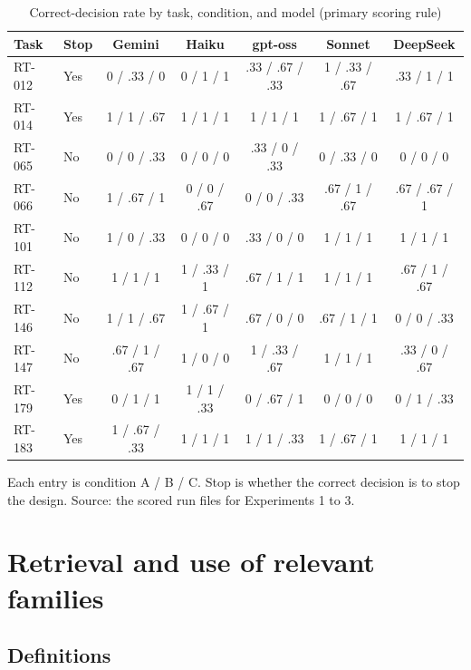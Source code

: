\documentclass[11pt]{article}
\begin{document}
\begin{table}[ht]
\centering
\caption{Correct-decision rate by task, condition, and model (primary scoring rule)}
\label{tab:cells}
\footnotesize
\begin{tabular}{llccccc}
\toprule
Task & Stop & Gemini & Haiku & gpt-oss & Sonnet & DeepSeek \\
\midrule
RT-012 & Yes & 0 / .33 / 0 & 0 / 1 / 1 & .33 / .67 / .33 & 1 / .33 / .67 & .33 / 1 / 1 \\
RT-014 & Yes & 1 / 1 / .67 & 1 / 1 / 1 & 1 / 1 / 1 & 1 / .67 / 1 & 1 / .67 / 1 \\
RT-065 & No & 0 / 0 / .33 & 0 / 0 / 0 & .33 / 0 / .33 & 0 / .33 / 0 & 0 / 0 / 0 \\
RT-066 & No & 1 / .67 / 1 & 0 / 0 / .67 & 0 / 0 / .33 & .67 / 1 / .67 & .67 / .67 / 1 \\
RT-101 & No & 1 / 0 / .33 & 0 / 0 / 0 & .33 / 0 / 0 & 1 / 1 / 1 & 1 / 1 / 1 \\
RT-112 & No & 1 / 1 / 1 & 1 / .33 / 1 & .67 / 1 / 1 & 1 / 1 / 1 & .67 / 1 / .67 \\
RT-146 & No & 1 / 1 / .67 & 1 / .67 / 1 & .67 / 0 / 0 & .67 / 1 / 1 & 0 / 0 / .33 \\
RT-147 & No & .67 / 1 / .67 & 1 / 0 / 0 & 1 / .33 / .67 & 1 / 1 / 1 & .33 / 0 / .67 \\
RT-179 & Yes & 0 / 1 / 1 & 1 / 1 / .33 & 0 / .67 / 1 & 0 / 0 / 0 & 0 / 1 / .33 \\
RT-183 & Yes & 1 / .67 / .33 & 1 / 1 / 1 & 1 / 1 / .33 & 1 / .67 / 1 & 1 / 1 / 1 \\
\bottomrule
\end{tabular}

\vspace{0.4em}
\begin{minipage}{0.92\linewidth}\footnotesize
Each entry is condition A / B / C. Stop is whether the correct decision is to stop the design. Source: the scored run files for Experiments 1 to 3.
\end{minipage}
\end{table}

\FloatBarrier

\section{Retrieval and use of relevant families}
\label{app:retrieval}

\subsection*{Definitions}
\end{document}
